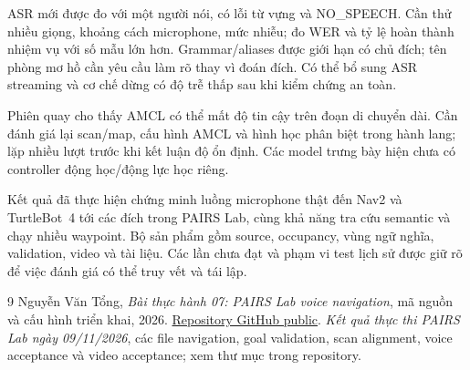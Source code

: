 \documentclass[12pt,a4paper]{article}
\newcommand{\code}[1]{\texttt{\detokenize{#1}}}
\newcommand{\repourl}{https://github.com/VTongg159/hri-turtlebot4-voice-navigation}
\begin{document}
ASR mới được đo với một người nói, có lỗi từ vựng và NO\_SPEECH. Cần thử
nhiều giọng, khoảng cách microphone, mức nhiễu; đo WER và tỷ lệ hoàn thành
nhiệm vụ với số mẫu lớn hơn. Grammar/aliases được giới hạn có chủ đích;
tên phòng mơ hồ cần yêu cầu làm rõ thay vì đoán đích. Có thể bổ sung ASR
streaming và cơ chế dừng có độ trễ thấp sau khi kiểm chứng an toàn.

Phiên quay cho thấy AMCL có thể mất độ tin cậy trên đoạn di chuyển dài.
Cần đánh giá lại scan/map, cấu hình AMCL và hình học phân biệt trong
hành lang; lặp nhiều lượt trước khi kết luận độ ổn định. Các model
trưng bày hiện chưa có controller động học/động lực học riêng.

Kết quả đã thực hiện chứng minh luồng microphone thật đến Nav2 và
TurtleBot~4 tới các đích trong PAIRS Lab, cùng khả năng tra cứu semantic
và chạy nhiều waypoint. Bộ sản phẩm gồm source, occupancy, vùng ngữ nghĩa,
validation, video và tài liệu. Các lần chưa đạt và phạm vi test lịch sử
được giữ rõ để việc đánh giá có thể truy vết và tái lập.

\begin{thebibliography}{9}
Nguyễn Văn Tổng, \emph{Bài thực hành 07: PAIRS Lab voice navigation},
mã nguồn và cấu hình triển khai, 2026.
\href{\repourl}{Repository GitHub public}.
\emph{Kết quả thực thi PAIRS Lab ngày 09/11/2026}, các file navigation,
goal validation, scan alignment, voice acceptance và video acceptance;
xem thư mục \code{submission/evidence/} trong repository.
\end{thebibliography}
\end{document}
